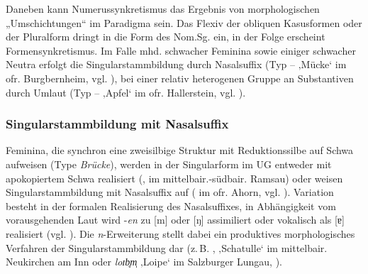 \begin{sloppypar}
Daneben kann Numerussynkretismus das Ergebnis von morphologischen „Umschichtungen“ \citep[185]{Rowley1997} im Paradigma sein. Das Flexiv der obliquen Kasusformen oder der Pluralform dringt in die Form des Nom.Sg. ein, in der Folge erscheint Formensynkretismus. Im Falle mhd. schwacher Feminina sowie einiger schwacher Neutra erfolgt die Singularstammbildung durch Nasalsuffix (Typ  --  ‚Mücke‘ im ofr. Burgbernheim, vgl. ), bei einer relativ heterogenen Gruppe an Substantiven durch Umlaut (Typ   --  ‚Apfel‘ im ofr. Hallerstein, vgl. ).
\end{sloppypar}

\subsubsection{Singularstammbildung mit Nasalsuffix}
\label{sec:7.1.3.1}
Feminina, die synchron eine zweisilbige Struktur mit Reduktionssilbe auf Schwa aufweisen (Type \textit{Brücke}), werden in der Singularform im UG entweder mit apokopiertem Schwa realisiert (, im mittelbair.-südbair. Ramsau) oder weisen Singularstammbildung mit Nasalsuffix auf (  im ofr. Ahorn, vgl. \cites[401]{Rowley1990a}[132--133]{Rowley1997}). Variation besteht in der formalen Realisierung des Nasalsuffixes, in Abhängigkeit vom vorausgehenden Laut wird
{}-\textit{en} zu [m] oder [ŋ] assimiliert oder vokalisch als [ɐ] realisiert (vgl. ). Die \textit{n}{}-Erweiterung stellt dabei ein produktives morphologisches Verfahren der Singularstammbildung dar (z.\,B. , ‚Schatulle‘ im mittelbair. Neukirchen am Inn oder \textit{loɪb̥m̩} ‚Loipe‘ im Salzburger Lungau, \citealt[132]{Mauser2000}).

